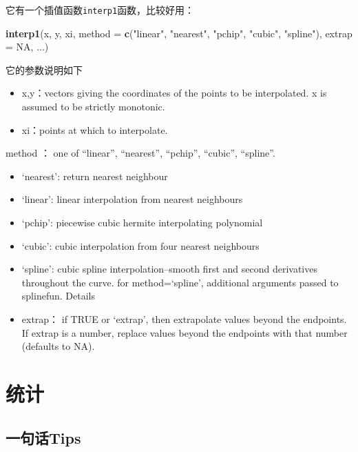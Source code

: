 \documentclass[
]{book}
\newenvironment{Shaded}{\begin{snugshade}}{\end{snugshade}}
\newcommand{\DataTypeTok}[1]{\textcolor[rgb]{0.13,0.29,0.53}{#1}}
\newcommand{\KeywordTok}[1]{\textcolor[rgb]{0.13,0.29,0.53}{\textbf{#1}}}
\newcommand{\NormalTok}[1]{#1}
\newcommand{\OtherTok}[1]{\textcolor[rgb]{0.56,0.35,0.01}{#1}}
\newcommand{\StringTok}[1]{\textcolor[rgb]{0.31,0.60,0.02}{#1}}
\providecommand{\tightlist}{%
  \setlength{\itemsep}{0pt}\setlength{\parskip}{0pt}}
\begin{document}
它有一个插值函数\texttt{interp1}函数，比较好用：

\begin{Shaded}
\begin{Highlighting}[]
\KeywordTok{interp1}\NormalTok{(x, y, xi, }\DataTypeTok{method =} \KeywordTok{c}\NormalTok{(}\StringTok{"linear"}\NormalTok{, }\StringTok{"nearest"}\NormalTok{, }\StringTok{"pchip"}\NormalTok{, }\StringTok{"cubic"}\NormalTok{, }\StringTok{"spline"}\NormalTok{), }
        \DataTypeTok{extrap =} \OtherTok{NA}\NormalTok{, ...)}
\end{Highlighting}
\end{Shaded}

它的参数说明如下

\begin{itemize}
\tightlist
\item
  x,y：vectors giving the coordinates of the points to be interpolated. x is assumed to be strictly monotonic.
\item
  xi：points at which to interpolate.
\end{itemize}

method ：
one of ``linear'', ``nearest'', ``pchip'', ``cubic'', ``spline''.

\begin{itemize}
\item
  `nearest': return nearest neighbour
\item
  `linear': linear interpolation from nearest neighbours
\item
  `pchip': piecewise cubic hermite interpolating polynomial
\item
  `cubic': cubic interpolation from four nearest neighbours
\item
  `spline': cubic spline interpolation--smooth first and second derivatives throughout the curve. for method=`spline', additional arguments passed to splinefun.
  Details
\item
  extrap：
  if TRUE or `extrap', then extrapolate values beyond the endpoints. If extrap is a number, replace values beyond the endpoints with that number (defaults to NA).
\end{itemize}

\hypertarget{ux7edfux8ba1}{%
\chapter{统计}\label{ux7edfux8ba1}}

\hypertarget{ux4e00ux53e5ux8bddtips-3}{%
\section{一句话Tips}\label{ux4e00ux53e5ux8bddtips-3}}
\end{document}
